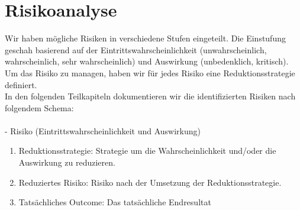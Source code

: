 \chapter{Risikoanalyse}
Wir haben mögliche Risiken in verschiedene Stufen eingeteilt.
Die Einstufung geschah basierend auf der Eintrittswahrscheinlichkeit (unwahrscheinlich, wahrscheinlich, sehr wahrscheinlich) und Auswirkung (unbedenklich, kritisch). 
Um das Risiko zu managen, haben wir für jedes Risiko eine Reduktionsstrategie definiert.\\
In den folgenden Teilkapiteln dokumentieren wir die identifizierten Risiken nach folgendem Schema:\\
\\
- Risiko (Eintrittswahrscheinlichkeit und Auswirkung)
\begin{enumerate}
    \item Reduktionsstrategie: Strategie um die Wahrscheinlichkeit und/oder die Auswirkung zu reduzieren.
    \item Reduziertes Risiko: Risiko nach der Umsetzung der Reduktionsstrategie.
    \item Tatsächliches Outcome: Das tatsächliche Endresultat
\end{enumerate}

